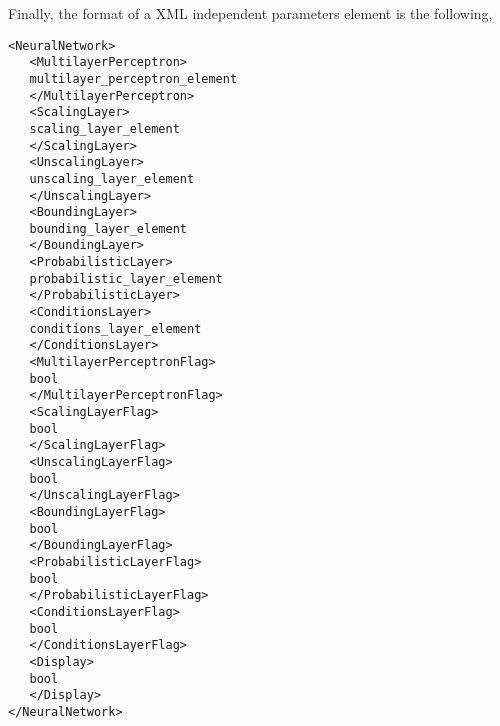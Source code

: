 Finally, the format of a XML independent parameters element is the following,

\begin{lstlisting}
<NeuralNetwork>
   <MultilayerPerceptron>
   multilayer_perceptron_element
   </MultilayerPerceptron>
   <ScalingLayer>
   scaling_layer_element
   </ScalingLayer>
   <UnscalingLayer>
   unscaling_layer_element
   </UnscalingLayer>
   <BoundingLayer>
   bounding_layer_element
   </BoundingLayer>
   <ProbabilisticLayer>
   probabilistic_layer_element
   </ProbabilisticLayer>
   <ConditionsLayer>
   conditions_layer_element
   </ConditionsLayer>
   <MultilayerPerceptronFlag>
   bool
   </MultilayerPerceptronFlag>
   <ScalingLayerFlag>
   bool
   </ScalingLayerFlag>
   <UnscalingLayerFlag>
   bool
   </UnscalingLayerFlag>
   <BoundingLayerFlag>
   bool
   </BoundingLayerFlag>
   <ProbabilisticLayerFlag>
   bool
   </ProbabilisticLayerFlag>
   <ConditionsLayerFlag>
   bool
   </ConditionsLayerFlag>
   <Display>
   bool
   </Display>
</NeuralNetwork>
\end{lstlisting}

